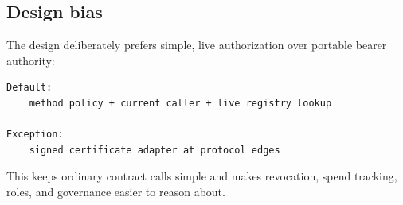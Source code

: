 \subsection{Design bias}

The design deliberately prefers simple, live authorization over portable bearer authority:

\begin{lstlisting}
Default:
    method policy + current caller + live registry lookup

Exception:
    signed certificate adapter at protocol edges
\end{lstlisting}

This keeps ordinary contract calls simple and makes revocation, spend tracking, roles, and governance easier to reason about.
